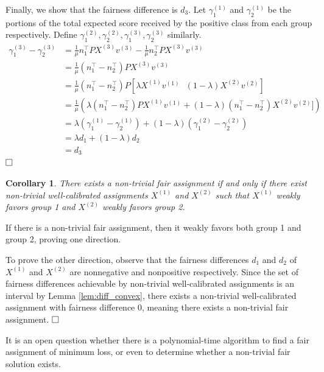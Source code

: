 \documentclass[11pt]{article}
\def\tran{^{\top}}
\def\squarebox#1{\hbox to #1{\hfill\vbox to #1{\vfill}}}
\newcommand{\qed}{\hspace*{\fill}\vbox{\hrule\hbox{\vrule\squarebox{.667em}\vrule}\hrule}\smallskip}
\newenvironment{proof}{\noindent{\bf Proof:~~}}{\(\qed\)}
\newtheorem{corollary}[theorem]{Corollary}
\begin{document}
\begin{proof}
  Finally, we show that the fairness difference is $d_3$. Let
  $\gamma_1^{(1)}$ and $\gamma_2^{(1)}$ be the portions of the total 
  expected score
  received by the positive class from each group respectively.
  Define
  $\gamma_1^{(2)}, \gamma_2^{(2)}, \gamma_1^{(3)}, \gamma_2^{(3)}$ similarly.
  \begin{align*}
    \gamma_1^{(3)} - \gamma_2^{(3)} &= \frac{1}{\mu} n_1\tran
    PX^{(3)}v^{(3)} -
    \frac{1}{\mu} n_2\tran PX^{(3)}v^{(3)} \\
    &= \frac{1}{\mu} (n_1\tran - n_2\tran) PX^{(3)}v^{(3)} \\
    &= \frac{1}{\mu} (n_1\tran - n_2\tran) P[\lambda X^{(1)}v^{(1)} ~~~
    (1-\lambda) X^{(2)} v^{(2)}] \\
    &= \frac{1}{\mu} (\lambda (n_1\tran - n_2\tran) PX^{(1)}v^{(1)} + 
    (1-\lambda) (n_1\tran - n_2\tran) X^{(2)} v^{(2)}]) \\
    &= \lambda(\gamma_1^{(1)} - \gamma_2^{(1)}) + (1-\lambda)
    (\gamma_1^{(2)} - \gamma_2^{(2)}) \\
    &= \lambda d_1 + (1-\lambda) d_2 \\
    &= d_3
  \end{align*}
\end{proof}


\begin{corollary}
  There exists a non-trivial fair assignment if and only if there exist
  non-trivial well-calibrated assignments $X^{(1)}$ and $X^{(2)}$ such that
  $X^{(1)}$ weakly favors group 1 and $X^{(2)}$ weakly favors group 2.
\end{corollary}
\begin{proof}
  If there is a non-trivial fair assignment, then it weakly favors both group 1
  and group 2, proving one direction.

  To prove the other direction, observe that the fairness differences $d_1$ and
  $d_2$ of $X^{(1)}$ and $X^{(2)}$ are nonnegative and nonpositive respectively.
  Since the set of fairness differences achievable by non-trivial
  well-calibrated assignments is an interval by Lemma \ref{lem:diff_convex}, 
  there
  exists a non-trivial well-calibrated assignment with fairness difference 0,
  meaning there exists a non-trivial fair assignment.
\end{proof}

It is an open question whether there is a polynomial-time algorithm to find
a fair assignment of minimum loss, or even to determine whether a
non-trivial fair solution exists.
\end{document}
